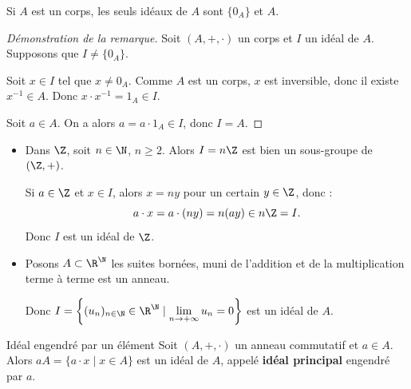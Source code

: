 \begin{remarque}
    Si $A$ est un corps, les seuls idéaux de $A$ sont $\{0_A\}$ et $A$.
\end{remarque}

\begin{proof}[Démonstration de la remarque]

    Soit $(A, +, \cdot)$ un corps et $I$ un idéal de $A$. Supposons que $I \neq \{0_A\}$.

    Soit $x \in I$ tel que $x \neq 0_A$. Comme $A$ est un corps, $x$ est inversible, donc
    il existe $x^{-1} \in A$. Donc $x \cdot x^{-1} = 1_A \in I$.

    Soit $a \in A$. On a alors $a = a \cdot 1_A \in I$, donc $I = A$.
\end{proof}

\begin{exemple}
    \begin{itemize}
        \item Dans $\Z$, soit $n \in \N$, $n \geqslant 2$. Alors $I = n\Z$ est bien un sous-groupe de $(\Z, +)$.

        Si $a \in \Z$ et $x \in I$, alors $x = ny$ pour un certain $y \in \Z$, donc :
        \[a \cdot x = a \cdot (ny) = n(ay) \in n\Z = I.\]
        Donc $I$ est un idéal de $\Z$.

        \item Posons $A \subset \R^{\N}$ les suites bornées, muni de l'addition et de la multiplication terme à terme
        est un anneau.

        Donc $I = \left\{(u_n)_{n \in \N} \in \R^{\N} \mid \lim\limits_{n \to +\infty} u_n = 0\right\}$ est un idéal de $A$.
    \end{itemize}
\end{exemple}

\begin{theoreme}{Idéal engendré par un élément}{}
    Soit $(A, +, \cdot)$ un anneau commutatif et $a \in A$. Alors
    $aA = \{a \cdot x \mid x \in A\}$ est un idéal de $A$, appelé
    \textbf{idéal principal} engendré par $a$.
\end{theoreme}


